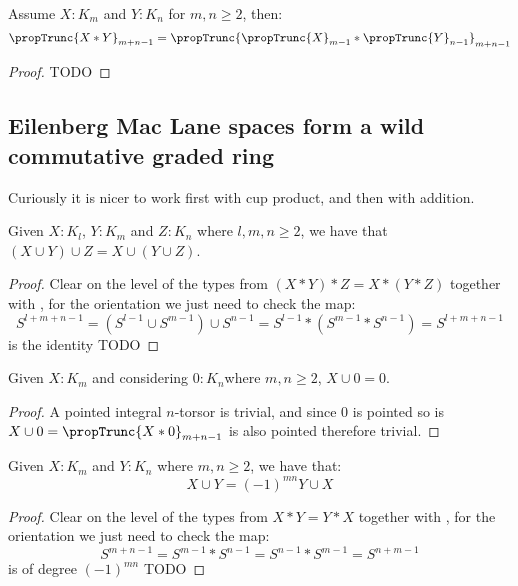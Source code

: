 \begin{lemma}\label{truncation-and-join}
Assume $X:K_m$ and $Y:K_n$ for $m,n\geq 2$, then:
\[\propTrunc{X*Y}_{m+n-1} = \propTrunc{\propTrunc{X}_{m-1}*\propTrunc{Y}_{n-1}}_{m+n-1}\]
\end{lemma}

\begin{proof}
TODO
\end{proof}



\subsection{Eilenberg Mac Lane spaces form a wild commutative graded ring}

Curiously it is nicer to work first with cup product, and then with addition.

\begin{lemma}
Given $X:K_l$, $Y:K_m$ and $Z:K_n$ where $l,m,n\geq 2$, we have that $(X\cup Y)\cup Z = X\cup (Y\cup Z)$.
\end{lemma}

\begin{proof}
Clear on the level of the types from $(X*Y)*Z = X*(Y*Z)$ together with , for the orientation we just need to check the map:
\[S^{l+m+n-1} = (S^{l-1}\cup S^{m-1})\cup S^{n-1} = S^{l-1}*(S^{m-1}*S^{n-1}) = S^{l+m+n-1}\]
is the identity TODO
\end{proof}

\begin{lemma}
Given $X:K_m$ and considering $0:K_{n}$where $m,n\geq 2$, $X\cup 0 = 0$.
\end{lemma}

\begin{proof}
A pointed integral $n$-torsor is trivial, and since $0$ is pointed so is $X\cup 0 = \propTrunc{X*0}_{m+n-1}$ is also pointed therefore trivial.
\end{proof}

\begin{lemma}
Given $X:K_{m}$ and $Y:K_{n}$ where $m,n\geq 2$, we have that:
\[X\cup Y = (-1)^{mn} Y\cup X\]
\end{lemma}

\begin{proof}
Clear on the level of the types from $X*Y = Y*X$ together with , for the orientation we just need to check the map:
\[S^{m+n-1} = S^{m-1}*S^{n-1} = S^{n-1}*S^{m-1} = S^{n+m-1}\]
is of degree $(-1)^{mn}$ TODO
\end{proof}

